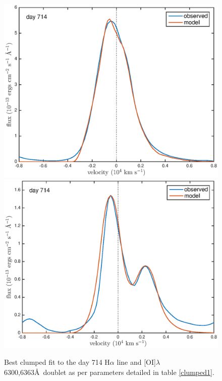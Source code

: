 \documentclass[useAMS,usenatbib,usegraphicx]{mnras}
\begin{document}
 \begin{figure}
\begin{center}
\includegraphics[trim =37 10 45 15,clip=true,scale=0.51]{clump_1/best_fit/d714Ha}
\includegraphics[trim =37 10 45 15,clip=true,scale=0.51]{clump_1/best_fit/d714OI}
\caption{Best clumped fit to the day 714 H$\alpha$ line and [OI]$\lambda$6300,6363\AA\ doublet as per parameters detailed in table \ref{clumped1}.}
\label{d714_c}
\end{center}
\end{figure}
\end{document}
